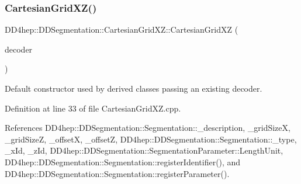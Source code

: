 \hypertarget{class_d_d4hep_1_1_d_d_segmentation_1_1_cartesian_grid_x_z_a0a3f69150eb5dae849511529138ba094}{}\label{class_d_d4hep_1_1_d_d_segmentation_1_1_cartesian_grid_x_z_a0a3f69150eb5dae849511529138ba094} 
\subsubsection{\texorpdfstring{Cartesian\+Grid\+X\+Z()}{CartesianGridXZ()}\hspace{0.1cm}{\footnotesize\ttfamily [2/2]}}
{\footnotesize\ttfamily D\+D4hep\+::\+D\+D\+Segmentation\+::\+Cartesian\+Grid\+X\+Z\+::\+Cartesian\+Grid\+XZ (\begin{DoxyParamCaption}\item[{\hyperlink{class_d_d4hep_1_1_d_d_segmentation_1_1_bit_field64}{Bit\+Field64} $\ast$}]{decoder }\end{DoxyParamCaption})}



Default constructor used by derived classes passing an existing decoder. 



Definition at line 33 of file Cartesian\+Grid\+X\+Z.\+cpp.



References D\+D4hep\+::\+D\+D\+Segmentation\+::\+Segmentation\+::\+\_\+description, \+\_\+grid\+SizeX, \+\_\+grid\+SizeZ, \+\_\+offsetX, \+\_\+offsetZ, D\+D4hep\+::\+D\+D\+Segmentation\+::\+Segmentation\+::\+\_\+type, \+\_\+x\+Id, \+\_\+z\+Id, D\+D4hep\+::\+D\+D\+Segmentation\+::\+Segmentation\+Parameter\+::\+Length\+Unit, D\+D4hep\+::\+D\+D\+Segmentation\+::\+Segmentation\+::register\+Identifier(), and D\+D4hep\+::\+D\+D\+Segmentation\+::\+Segmentation\+::register\+Parameter().

\hypertarget{class_d_d4hep_1_1_d_d_segmentation_1_1_cartesian_grid_x_z_a2e43952843eb3f66c0ab65c779045b1f}{}\label{class_d_d4hep_1_1_d_d_segmentation_1_1_cartesian_grid_x_z_a2e43952843eb3f66c0ab65c779045b1f} 
